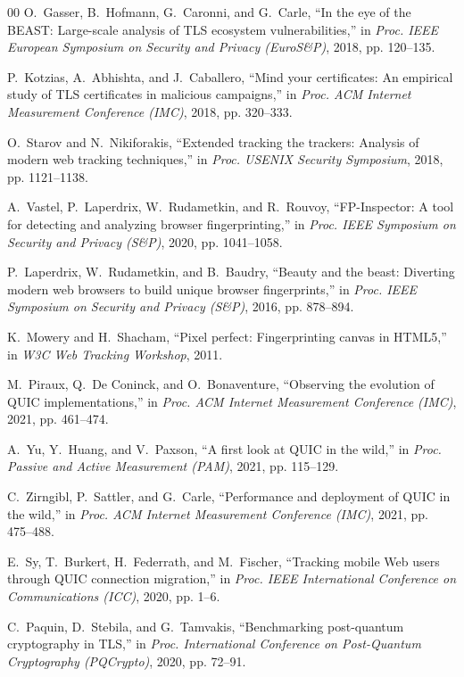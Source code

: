 \documentclass[conference]{IEEEtran}
\begin{document}
\begin{thebibliography}{00}
O.~Gasser, B.~Hofmann, G.~Caronni, and G.~Carle, ``In the eye of the BEAST: Large-scale analysis of TLS ecosystem vulnerabilities,'' in \emph{Proc. IEEE European Symposium on Security and Privacy (EuroS\&P)}, 2018, pp. 120--135.

P.~Kotzias, A.~Abhishta, and J.~Caballero, ``Mind your certificates: An empirical study of TLS certificates in malicious campaigns,'' in \emph{Proc. ACM Internet Measurement Conference (IMC)}, 2018, pp. 320--333.

O.~Starov and N.~Nikiforakis, ``Extended tracking the trackers: Analysis of modern web tracking techniques,'' in \emph{Proc. USENIX Security Symposium}, 2018, pp. 1121--1138.

A.~Vastel, P.~Laperdrix, W.~Rudametkin, and R.~Rouvoy, ``FP-Inspector: A tool for detecting and analyzing browser fingerprinting,'' in \emph{Proc. IEEE Symposium on Security and Privacy (S\&P)}, 2020, pp. 1041--1058.

P.~Laperdrix, W.~Rudametkin, and B.~Baudry, ``Beauty and the beast: Diverting modern web browsers to build unique browser fingerprints,'' in \emph{Proc. IEEE Symposium on Security and Privacy (S\&P)}, 2016, pp. 878--894.

K.~Mowery and H.~Shacham, ``Pixel perfect: Fingerprinting canvas in HTML5,'' in \emph{W3C Web Tracking Workshop}, 2011.

M.~Piraux, Q.~De Coninck, and O.~Bonaventure, ``Observing the evolution of QUIC implementations,'' in \emph{Proc. ACM Internet Measurement Conference (IMC)}, 2021, pp. 461--474.

A.~Yu, Y.~Huang, and V.~Paxson, ``A first look at QUIC in the wild,'' in \emph{Proc. Passive and Active Measurement (PAM)}, 2021, pp. 115--129.

C.~Zirngibl, P.~Sattler, and G.~Carle, ``Performance and deployment of QUIC in the wild,'' in \emph{Proc. ACM Internet Measurement Conference (IMC)}, 2021, pp. 475--488.

E.~Sy, T.~Burkert, H.~Federrath, and M.~Fischer, ``Tracking mobile Web users through QUIC connection migration,'' in \emph{Proc. IEEE International Conference on Communications (ICC)}, 2020, pp. 1--6.

C.~Paquin, D.~Stebila, and G.~Tamvakis, ``Benchmarking post-quantum cryptography in TLS,'' in \emph{Proc. International Conference on Post-Quantum Cryptography (PQCrypto)}, 2020, pp. 72--91.


\end{thebibliography}
\end{document}
